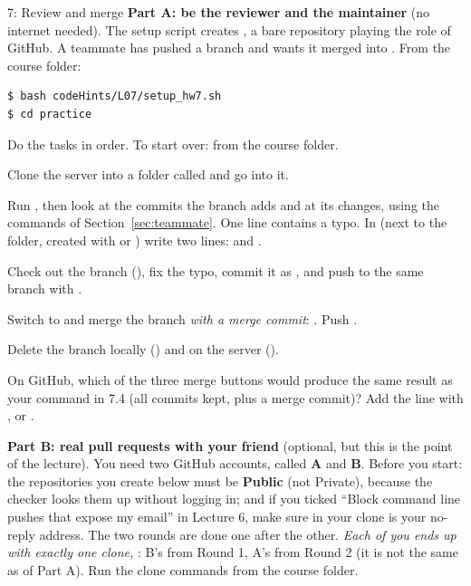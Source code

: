 \begin{homework}{7: Review and merge}
\textbf{Part A: be the reviewer and the maintainer} (no internet needed). The setup script creates , a bare repository playing the role of GitHub. A teammate has pushed a branch  and wants it merged into . From the course folder:
\begin{lstlisting}
$ bash codeHints/L07/setup_hw7.sh
$ cd practice
\end{lstlisting}
Do the tasks in order. To start over:  from the course folder.

\begin{description}[leftmargin=1.2em,style=nextline]
\item[7.1 Clone] Clone the server into a folder called  and go into it.
\item[7.2 Review] Run , then look at the commits the branch adds and at its changes, using the commands of Section~\ref{sec:teammate}. One line contains a typo. In  (next to the  folder, created with  or ) write two lines:  and .
\item[7.3 Suggest a fix] Check out the branch (), fix the typo, commit it as , and push to the same branch with .
\item[7.4 Merge] Switch to  and merge the branch \emph{with a merge commit}: . Push .
\item[7.5 Clean up] Delete the branch locally () and on the server ().
\item[7.6 Question] On GitHub, which of the three merge buttons would produce the same result as your command in 7.4 (all commits kept, plus a merge commit)? Add the line  with ,  or .
\end{description}

\textbf{Part B: real pull requests with your friend} (optional, but this is the point of the lecture). You need two GitHub accounts, called \textbf{A} and \textbf{B}. Before you start: the repositories you create below must be \textbf{Public} (not Private), because the checker looks them up without logging in; and if you ticked ``Block command line pushes that expose my email'' in Lecture 6, make sure  in your clone is your no-reply address. The two rounds are done one after the other. \emph{Each of you ends up with exactly one clone, }: B's from Round 1, A's from Round 2 (it is not the same as  of Part A). Run the clone commands from the course folder.


\end{homework}
